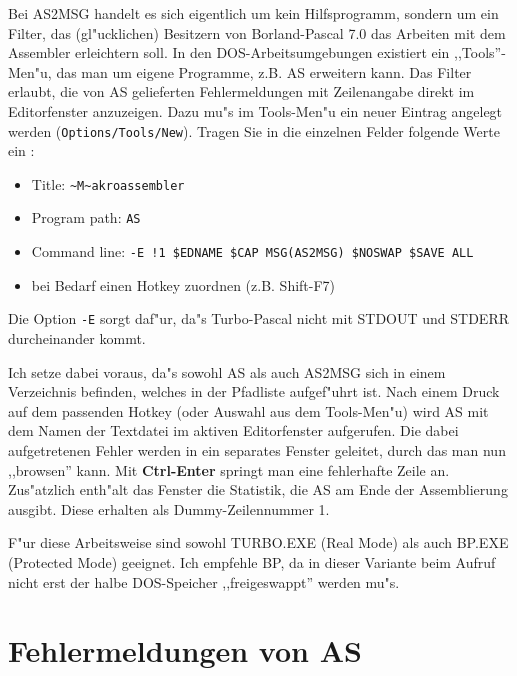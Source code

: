 \documentclass[12pt,a4paper,twoside]{report}
\newcommand{\bb}[1]{{\bf #1}}
\newcommand{\tty}[1]{{\tt #1}}
\begin{document}
Bei AS2MSG handelt es sich eigentlich um kein Hilfsprogramm, sondern um ein
Filter, das (gl"ucklichen) Besitzern von Borland-Pascal 7.0 das Arbeiten
mit dem Assembler erleichtern soll.  In den DOS-Arbeitsumgebungen existiert
ein ,,Tools''-Men"u, das man um eigene Programme, z.B. AS erweitern kann.
Das Filter erlaubt, die von AS gelieferten Fehlermeldungen mit Zeilenangabe
direkt im Editorfenster anzuzeigen.  Dazu mu"s im Tools-Men"u ein neuer
Eintrag angelegt werden (\tty{Options/Tools/New}).  Tragen Sie in die
einzelnen Felder folgende Werte ein :
\begin{itemize}
\item{Title: {\tt \verb!~!M\verb!~!akroassembler}}
\item{Program path: \tty{AS}}
\item{Command line: \tty{-E !1 \$EDNAME \$CAP MSG(AS2MSG) \$NOSWAP \$SAVE
ALL}}
\item{bei Bedarf einen Hotkey zuordnen (z.B. Shift-F7)}
\end{itemize}
Die Option \tty{-E} sorgt daf"ur, da"s Turbo-Pascal nicht mit STDOUT und
STDERR durcheinander kommt.
\par
Ich setze dabei voraus, da"s sowohl AS als auch AS2MSG sich in einem
Verzeichnis befinden, welches in der Pfadliste aufgef"uhrt ist.  Nach einem
Druck auf dem passenden Hotkey (oder Auswahl aus dem Tools-Men"u) wird AS mit
dem Namen der Textdatei im aktiven Editorfenster aufgerufen.  Die dabei
aufgetretenen Fehler werden in ein separates Fenster geleitet, durch das man
nun ,,browsen'' kann.  Mit \bb{Ctrl-Enter} springt man eine fehlerhafte
Zeile an.  Zus"atzlich enth"alt das Fenster die Statistik, die AS am Ende
der Assemblierung ausgibt.  Diese erhalten als Dummy-Zeilennummer 1.
\par
F"ur diese Arbeitsweise sind sowohl TURBO.EXE (Real Mode) als auch BP.EXE
(Protected Mode) geeignet.  Ich empfehle BP, da in dieser Variante beim
Aufruf nicht erst der halbe DOS-Speicher ,,freigeswappt'' werden mu"s.

\cleardoublepage

\appendix


\cleardoublepage
\chapter{Fehlermeldungen von AS}
\label{ChapErrMess}
\end{document}
